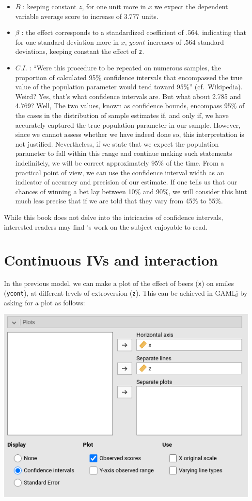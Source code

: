 \documentclass[
]{book}
\providecommand{\tightlist}{%
  \setlength{\itemsep}{0pt}\setlength{\parskip}{0pt}}
\begin{document}
\begin{itemize}
\tightlist
\item
  \(B\) : keeping constant \(z\), for one unit more in \(x\) we expect the dependent variable average score to increase of \(3.777\) units.
\item
  \(\beta\) : the effect corresponds to a standardized coefficient of \(.564\), indicating that for one standard deviation more in \(x\), \(ycont\) increases of .564 standard deviations, keeping constant the effect of \texttt{z}.
\item
  \(C.I.\) : ``Were this procedure to be repeated on numerous samples, the proportion of calculated 95\% confidence intervals that encompassed the true value of the population parameter would tend toward 95\%'' (cf.~Wikipedia). Weird? Yes, that's what confidence intervals are. But what about 2.785 and 4.769? Well, The two values, known as confidence bounds, encompass 95\% of the cases in the distribution of sample estimates if, and only if, we have accurately captured the true population parameter in our sample. However, since we cannot assess whether we have indeed done so, this interpretation is not justified. Nevertheless, if we state that we expect the population parameter to fall within this range and continue making such statements indefinitely, we will be correct approximately 95\% of the time. From a practical point of view, we can use the confidence interval width as an indicator of accuracy and precision of our estimate. If one tells us that our chances of winning a bet lay between 10\% and 90\%, we will consider this hint much less precise that if we are told that they vary from 45\% to 55\%.
\end{itemize}

While this book does not delve into the intricacies of confidence intervals, interested readers may find \citet{mayoci}'s work on the subject enjoyable to read.

\hypertarget{moderation}{%
\section{Continuous IVs and interaction}\label{moderation}}

In the previous model, we can make a plot of the effect of beers (\texttt{x}) on smiles (\texttt{ycont}), at different levels of extroversion (\texttt{z}). This can be achieved in {GAMLj} by asking for a plot as follows:

\includegraphics[width=0.7\linewidth]{bookletpics/2_input10}
\end{document}
